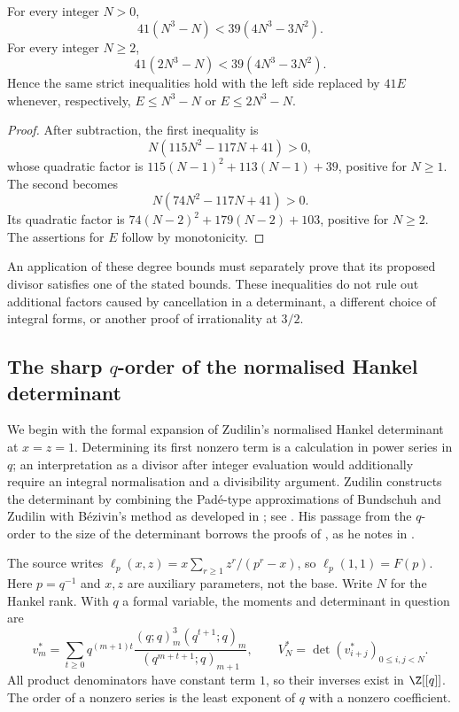 \begin{theorem}\label{long1049:res:chargeceilings}
For every integer $N>0$,
\[
 41(N^3-N)<39(4N^3-3N^2).
\]
For every integer $N\ge2$,
\[
 41(2N^3-N)<39(4N^3-3N^2).
\]
Hence the same strict inequalities hold with the left side replaced by
$41E$ whenever, respectively, $E\le N^3-N$ or $E\le2N^3-N$.
\end{theorem}

\begin{proof}
After subtraction, the first inequality is
\[
 N(115N^2-117N+41)>0,
\]
whose quadratic factor is $115(N-1)^2+113(N-1)+39$, positive for
$N\ge1$. The second becomes
\[
 N(74N^2-117N+41)>0.
\]
Its quadratic factor is $74(N-2)^2+179(N-2)+103$, positive for
$N\ge2$. The assertions for $E$ follow by monotonicity.
\end{proof}

An application of these degree bounds must separately
prove that its proposed divisor satisfies one of the stated bounds.
These inequalities do not rule out additional factors caused by
cancellation in a determinant, a different choice of integral forms,
or another proof of irrationality at $3/2$.

\subsection{The sharp \texorpdfstring{$q$}{q}-order of the normalised Hankel
determinant}\label{long1049:sec:hankel-order}

We begin with the formal expansion of Zudilin's normalised Hankel
determinant at $x=z=1$. Determining its first nonzero term is a
calculation in power series in $q$; an interpretation as a divisor
after integer evaluation would additionally require an integral
normalisation and a divisibility argument. Zudilin constructs the
determinant by combining the Pad\'e-type approximations of Bundschuh
and Zudilin \cite{bundschuhzudilin2008} with B\'ezivin's method as developed
in \cite{krvz2009}; see \cite[Sec.~2, p.~3]{zudilin2016}.  His passage from the
$q$-order to the size of the determinant borrows the proofs of
\cite[Lemma~2, p.~12, and Prop.~3, p.~13]{krvz2009}, as he notes in
\cite[Sec.~4, p.~7]{zudilin2016}.

The source writes $\ell_p(x,z)=x\sum_{r\ge1}z^r/(p^r-x)$, so
$\ell_p(1,1)=F(p)$. Here $p=q^{-1}$ and $x,z$ are auxiliary
parameters, not the base. Write $N$ for the Hankel rank. With $q$ a
formal variable, the moments and determinant in question are
\[
 v_m^*=\sum_{t\ge0}q^{(m+1)t}
       \frac{(q;q)_m^3(q^{t+1};q)_m}{(q^{m+t+1};q)_{m+1}},
 \qquad V_N^*=\det(v_{i+j}^*)_{0\le i,j<N}.
\]
All product denominators have constant term $1$, so their inverses
exist in $\Z[[q]]$. The order of a nonzero series is the least
exponent of $q$ with a nonzero coefficient.

